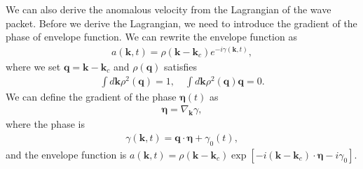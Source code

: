 \documentclass[12pt, oneside]{article}
\newcommand{\p}[1]{\left(#1\right)}
\newcommand{\bb}[1]{\left[#1\right]}
\numberwithin{equation}{subsection}
\begin{document}
We can also derive the anomalous velocity from the Lagrangian of the wave packet. Before we derive the Lagrangian, we need to introduce the gradient of the phase of envelope function. We can rewrite the envelope function as 
\begin{align}
	a \p{\bm{k}, t} = \rho \p{\bm{k} - \bm{k}_c} e^{-i \gamma \p{\bm{k}, t}},
\end{align}
where we set \(\bm{q} = \bm{k} - \bm{k}_c\) and \(\rho \p{\bm{q}}\) satisfies
\begin{align}
	\int d \bm{k} \rho^2 \p{\bm{q}} = 1, \quad \int d \bm{k} \rho^2 \p{\bm{q}} \bm{q} = 0.
\end{align}
We can define the gradient of the phase \(\bm{\eta} \p{t} \) as
\begin{align}
	\bm{\eta} = \nabla_{\bm{k}} \gamma,
\end{align}
where the phase is 
\begin{align}
	\gamma \p{\bm{k}, t} = \bm{q} \cdot \bm{\eta} + \gamma_0 \p{t},
\end{align}
and the envelope function is \(a \p{\bm{k}, t} = \rho \p{\bm{k} - \bm{k}_c} \exp{\bb{-i \p{\bm{k} - \bm{k}_c} \cdot \bm{\eta} - i \gamma_0}} \).
\end{document}
